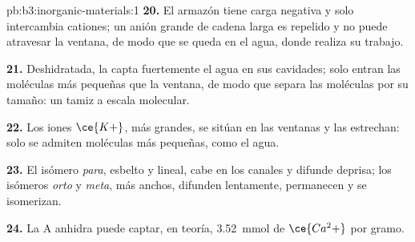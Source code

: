 \begin{solution}{pb:b3:inorganic-materials:1}
\textbf{20.} El armazón tiene carga negativa y solo intercambia cationes; un
anión grande de cadena larga es repelido y no puede atravesar la ventana, de modo que se queda
en el agua, donde realiza su trabajo.

\textbf{21.} Deshidratada, la  capta fuertemente el agua en sus cavidades; solo
entran las moléculas más pequeñas que la ventana, de modo que separa las moléculas por su tamaño:
un tamiz a escala molecular.

\textbf{22.} Los iones $\ce{K+}$, más grandes, se sitúan en las ventanas y las estrechan: solo se admiten
moléculas más pequeñas, como el agua.

\textbf{23.} El isómero \textit{para}, esbelto y lineal, cabe en los canales y difunde deprisa; los
isómeros \textit{orto} y \textit{meta}, más anchos, difunden lentamente, permanecen y se isomerizan.

\textbf{24.} La  A anhidra puede captar, en teoría, \qty{3.52}{mmol} de $\ce{Ca^2+}$ por gramo.
\end{solution}
